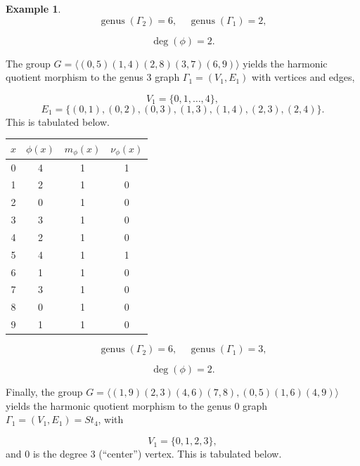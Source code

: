 \documentclass[12pt,letterpaper]{article}
\theoremstyle{definition}
\newtheorem{example}[theorem]{Example}
\DeclareMathOperator{\genus}{genus}
\begin{document}
\begin{example}
{\[
  \genus(\Gamma_2) =6,\ \ \ \ \
  \genus(\Gamma_1) =2,
\]

\[
\deg(\phi) =2.
\]

The group $G = \langle (0,5)(1,4)(2,8)(3,7)(6,9) \rangle$ yields the
harmonic quotient morphism to the genus $3$ graph
$\Gamma_1 = (V_1,E_1)$
with vertices and edges,

\[
V_1=\{0,1,\dots, 4\},
\]
\[
E_1=\{
(0, 1), (0, 2), (0, 3), (1, 3), (1, 4), (2, 3), (2, 4)
\}.
\]
This is tabulated below.

\begin{center}
\begin{tabular}{c|c|c|c}  
  $x$ & $\phi(x)$ & $m_\phi(x)$ & $\nu_\phi(x)$ \\ \hline
  0   &    4   &        1         &  1   \\
  1   &    2   &        1         &  0   \\
  2   &    0   &        1         &  0   \\
  3   &    3   &        1         &  0   \\
  4   &    2   &        1         &  0   \\
  5   &    4   &        1         &  1   \\
  6   &    1   &        1         &  0   \\
  7   &    3   &        1         &  0   \\
  8   &    0   &        1         &  0   \\
  9   &    1   &        1         &  0   \\
\end{tabular}
\end{center}

\[
  \genus(\Gamma_2) =6,\ \ \ \ \
  \genus(\Gamma_1) =3,
\]

\[
\deg(\phi) =2.
\]

Finally, the group
$G = \langle (1,9)(2,3)(4,6)(7,8), (0,5)(1,6)(4,9) \rangle$ yields the
harmonic quotient morphism to the genus $0$ graph
$\Gamma_1 = (V_1,E_1) = St_4$, with

\[
V_1=\{0, 1, 2, 3\},
\]
and $0$ is the degree $3$ (``center'') vertex.
This is tabulated below.

}
\end{example}
\end{document}
